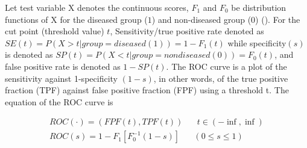 Let test variable X denotes the continuous scores,  $F_1$ and $F_0$ be distribution functions of X for the diseased group ($1$) and non-diseased group ($0$) (\cite{faraggi2000effect}). For the cut point (threshold value) $t$, Sensitivity/true positive rate denoted as $SE(t) = P(X>t| group = diseased{(1)}) =1-F_1(t)$ while specificity$(s)$ is denoted as $SP(t) = P(X<t|group = nondiseased{(0)}) = F_0(t)$, and false positive rate is denoted as $1-SP(t)$. The ROC curve is a plot of the sensitivity against 1-specificity $(1-s)$, in other words, of the true positive fraction (TPF) against false positive fraction (FPF) using a threshold t. The equation of the ROC curve is



\begin{equation}
\begin{split} \label{eqn_roc curve}
  ROC(\cdot) = {(FPF(t), TPF(t)) \;\;\; \;\;\;  t\in (-\inf, \inf)}\\
  ROC(s) = 1 - F_1[F_0^{-1}(1-s)] \;\;\; \;\;\;  (0 \leq s \leq 1)
\end{split}
\end{equation}


